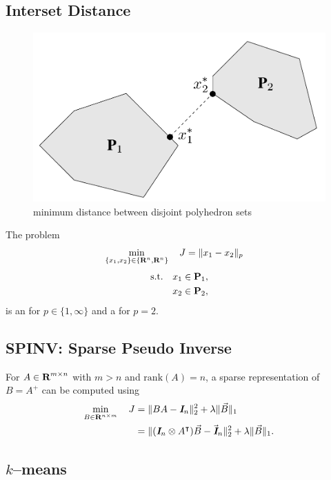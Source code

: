 \documentclass{article}
\begin{document}
    \subsection{Interset Distance}

    \begin{figure}[h!]
        \centering
        \includegraphics[width=.5\textwidth]{./figs/misc/dist.png}
        \caption{minimum distance between disjoint polyhedron sets}
        \label{fig:dist}
    \end{figure}

    The problem
    \begin{align*}
        \min_{\{x_1,x_2\}\in\{\textbf{R}^n,\textbf{R}^n\}}\quad J &= \|x_1-x_2\|_p
    \end{align*}
    \begin{align*}
        \text{s.t.}\quad x_1&\in\textbf{P}_1,\\
        x_2&\in\textbf{P}_2,
    \end{align*}
    is an \LP for $p\in\{1,\infty\}$ and a \QP for $p=2$.

\subsection{SPINV: Sparse Pseudo Inverse}

    For $A\in\textbf{R}^{m\times n}$ with $m>n$ and $\mathrm{rank}(A)=n$, 
    a sparse representation of 
    $B=A^+$ 
    can be computed using \cite{spinv}
    \begin{align*}
        \min_{B\in\textbf{R}^{n\times m}}\quad
        J
        &=
            \|BA-\emph{\textbf{I}} _n\|_2^2
        +
            \lambda\| \vec{B}\|_1
        \\
        &=
            \|(\emph{\textbf{I}} _n\otimes A^\intercal)\vec{B}-\vec{\emph{\textbf{I}}}_n\|_2^2
        +
            \lambda\|\vec{B}\|_1.
    \end{align*}


\subsection{$k$--means}
\end{document}
